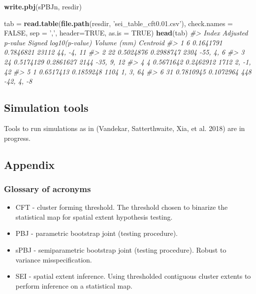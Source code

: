 \documentclass[]{article}
\newenvironment{Shaded}{\begin{snugshade}}{\end{snugshade}}
\newcommand{\KeywordTok}[1]{\textcolor[rgb]{0.13,0.29,0.53}{\textbf{#1}}}
\newcommand{\DataTypeTok}[1]{\textcolor[rgb]{0.13,0.29,0.53}{#1}}
\newcommand{\StringTok}[1]{\textcolor[rgb]{0.31,0.60,0.02}{#1}}
\newcommand{\CommentTok}[1]{\textcolor[rgb]{0.56,0.35,0.01}{\textit{#1}}}
\newcommand{\OtherTok}[1]{\textcolor[rgb]{0.56,0.35,0.01}{#1}}
\newcommand{\NormalTok}[1]{#1}
\providecommand{\tightlist}{%
  \setlength{\itemsep}{0pt}\setlength{\parskip}{0pt}}
\begin{document}
\begin{Shaded}
\begin{Highlighting}[]
\KeywordTok{write.pbj}\NormalTok{(sPBJn, resdir)}
\end{Highlighting}
\end{Shaded}

\begin{Shaded}
\begin{Highlighting}[]
\NormalTok{tab =}\StringTok{ }\KeywordTok{read.table}\NormalTok{(}\KeywordTok{file.path}\NormalTok{(resdir, }\StringTok{'sei_table_cft0.01.csv'}\NormalTok{), }\DataTypeTok{check.names =} \OtherTok{FALSE}\NormalTok{, }\DataTypeTok{sep =} \StringTok{','}\NormalTok{, }\DataTypeTok{header=}\OtherTok{TRUE}\NormalTok{, }\DataTypeTok{as.is =} \OtherTok{TRUE}\NormalTok{)}
\KeywordTok{head}\NormalTok{(tab)}
\CommentTok{#>   Index Adjusted p-value Signed log10(p-value) Volume (mm)   Centroid}
\CommentTok{#> 1     6        0.1641791             0.7846821       23112 44, -4, 11}
\CommentTok{#> 2    22        0.5024876             0.2988747        2304  -55, 4, 6}
\CommentTok{#> 3    24        0.5174129             0.2861627        2144 -35, 9, 12}
\CommentTok{#> 4     4        0.5671642             0.2462912        1712  2, -1, 42}
\CommentTok{#> 5     1        0.6517413             0.1859248        1104   1, 3, 64}
\CommentTok{#> 6    31        0.7810945             0.1072964         448 -42, 4, -8}
\end{Highlighting}
\end{Shaded}

\subsection{Simulation tools}\label{simulation-tools}

Tools to run simulations as in (Vandekar, Satterthwaite, Xia, et al.
2018) are in progress.

\subsection{Appendix}\label{appendix}

\subsubsection{Glossary of acronyms}\label{glossary-of-acronyms}

\begin{itemize}
\tightlist
\item
  CFT - cluster forming threshold. The threshold chosen to binarize the
  statistical map for spatial extent hypothesis testing.
\item
  PBJ - parametric bootstrap joint (testing procedure).
\item
  sPBJ - semiparametric bootstrap joint (testing procedure). Robust to
  variance misspecification.
\item
  SEI - spatial extent inference. Using thresholded contiguous cluster
  extents to perform inference on a statistical map.
\end{itemize}
\end{document}
